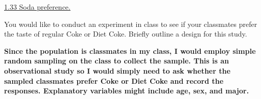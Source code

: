 \documentclass[10pt,letterpaper,unboxed,cm]{exam}
\begin{document}
\begin{questions}
	\question \underline{1.33 Soda preference.}

    You would like to conduct an experiment in class to see if your classmates prefer the taste of regular Coke or Diet Coke. Briefly outline a design for this study.
    
    \bigskip
    {\bf Since the population is classmates in my class, I would employ simple random sampling on the class to collect the sample. This is an observational study so I would simply need to ask whether the sampled classmates prefer Coke or Diet Coke and record the responses. Explanatory variables might include age, sex, and major.} 
    \bigskip



\end{questions}
\end{document}
